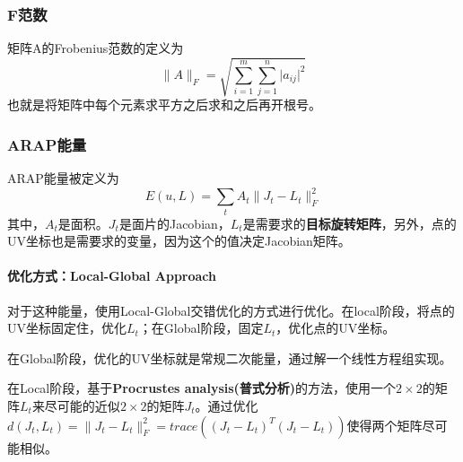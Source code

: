 \documentclass[a4paper]{D:/MyRepo/Script/latex/PaperReadingLog}
\begin{document}
\subsubsection{F范数}
矩阵$\mathrm{A}$的Frobenius范数的定义为
$$
\lVert A \lVert_F=\sqrt{\sum_{i=1}^m\sum_{j=1}^n\lvert a_{ij}\lvert^2}
$$
也就是将矩阵中每个元素求平方之后求和之后再开根号。

\subsubsection{ARAP能量}
ARAP能量被定义为
$$
E(u,L)=\sum_tA_t\lVert J_t-L_t \lVert_F^2
$$
其中，$A_t$是面积。$J_t$是面片的Jacobian，$L_t$是需要求的\textbf{目标旋转矩阵}，另外，点的UV坐标也是需要求的变量，因为这个的值决定Jacobian矩阵。
\paragraph{优化方式：Local-Global Approach}
对于这种能量，使用Local-Global交错优化的方式进行优化。在local阶段，将点的UV坐标固定住，优化$L_t$；在Global阶段，固定$L_t$，优化点的UV坐标。

在Global阶段，优化的UV坐标就是常规二次能量，通过解一个线性方程组实现。

在Local阶段，基于\textbf{Procrustes analysis(普式分析)}的方法，使用一个$2\times 2$的矩阵$L_t$来尽可能的近似$2\times 2$的矩阵$J_t$。通过优化$d(J_t,L_t)=\lVert J_t-L_t \lVert_F^2=trace((J_t-L_t)^T(J_t-L_t))$使得两个矩阵尽可能相似。



\end{document}
